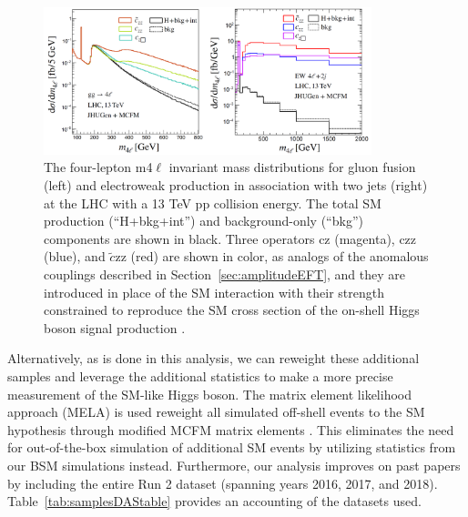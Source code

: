 \begin{figure}[!htb]
\centering
\includegraphics[width=0.85\textwidth,clip] {figures/offshellAC_BSI.png}
\caption{ The four-lepton m4$\ell$ invariant mass distributions for gluon fusion (left) and electroweak production in association with two jets (right) at the LHC with a 13 TeV pp collision energy. The total SM production (“H+bkg+int”) and background-only (“bkg”) components are shown in black. Three operators cz (magenta), czz (blue), and $\tilde{c}$zz (red) are shown in color, as analogs of the anomalous couplings described in Section~\ref{sec:amplitudeEFT}, and they are introduced in place of the SM interaction with their strength constrained to reproduce the SM cross section of the on-shell Higgs boson signal production \cite{offshellWGnote}.}
\label{fig:offshellAC_BSI}
\end{figure}

Alternatively, as is done in this analysis, we can reweight these additional samples and leverage the additional statistics to make a more precise measurement of the SM-like Higgs boson. The matrix element likelihood approach (MELA) is used reweight all simulated off-shell events to the SM hypothesis through modified MCFM matrix elements \cite{12077235,10073492}. This eliminates the need for out-of-the-box simulation of additional SM events by utilizing statistics from our BSM simulations instead. Furthermore, our analysis improves on past papers \cite{190100174} by including the entire Run 2 dataset (spanning years 2016, 2017, and 2018). Table~\ref{tab:samplesDAStable} provides an accounting of the datasets used.

